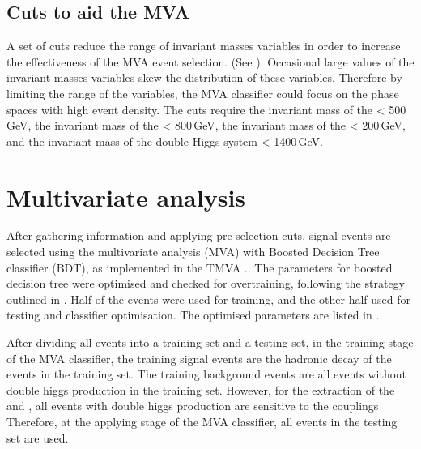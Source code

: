 \subsection{Cuts to aid the MVA}

A set of cuts reduce the range of invariant masses variables in order to increase the effectiveness of the MVA event selection. (See ). Occasional large values of the invariant masses variables skew the distribution of these variables. Therefore by limiting the range of the variables, the MVA classifier could focus on the phase spaces with high event density. The cuts require the invariant mass of the \Hbb < 500\,GeV, the invariant mass of the \HWW < 800\,GeV, the invariant mass of the \PW < 200\,GeV, and the invariant mass of the double Higgs system < 1400\,GeV.



\section{Multivariate analysis}
\label{sec:doubleHiggsMVA}
After gathering information and applying  pre-selection cuts, signal events are selected using the multivariate analysis (MVA) with Boosted Decision Tree classifier (BDT), as implemented in the TMVA \cite{Hocker:2007ht}.. The parameters for boosted decision tree were optimised and checked for overtraining, following the strategy outlined in . Half of the events were used for training, and the other half used for testing and classifier optimisation. The optimised parameters are listed in .

After dividing all events into a training set and a testing set, in the training stage of the MVA classifier, the training signal events are the  hadronic \WW decay of the \eeToHHbbWW events in the training set. The training background events are all events without double higgs production  in the training set. However, for the extraction of the \gHHH and \gWWHH,  all events with double higgs production are sensitive to the couplings Therefore, at the applying stage of the MVA classifier, all events in the testing set are used.



